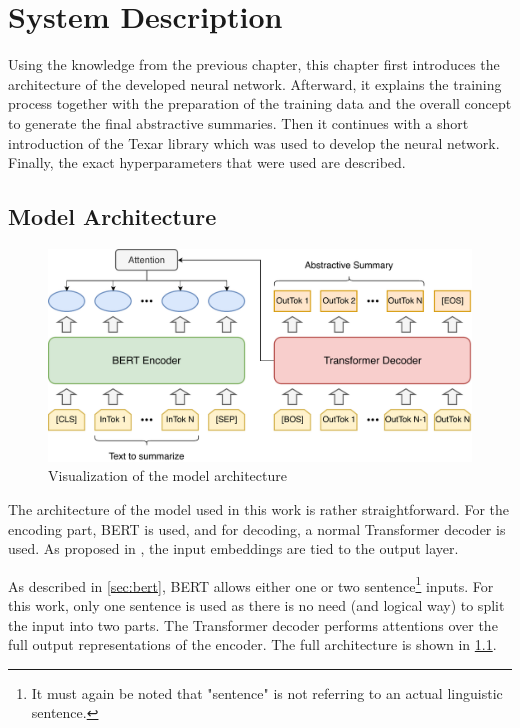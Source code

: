 \chapter{System Description}\label{ch:system-description}

Using the knowledge from the previous chapter, this chapter first introduces the architecture of the developed neural network.
Afterward, it explains the training process together with the preparation of the training data and the overall concept to generate the final abstractive summaries.
Then it continues with a short introduction of the Texar library \cite{hu2019texar} which was used to develop the neural network.
Finally, the exact hyperparameters that were used are described.


\section{Model Architecture}
 
\begin{figure}[h]
\centering
\includegraphics[width=0.7\paperwidth]{figures/summarization-architecture}
\caption{Visualization of the model architecture}
\label{fig:summarization-architecture}
\end{figure}

The architecture of the model used in this work is rather straightforward.
For the encoding part, BERT is used, and for decoding, a normal Transformer decoder is used.
As proposed in \cite{1608.05859}, the input embeddings are tied to the output layer.

As described in \cref{sec:bert}, BERT allows either one or two sentence\footnote{It must again be noted that "sentence" is not referring to an actual linguistic sentence.} inputs.
For this work, only one sentence is used as there is no need (and logical way) to split the input into two parts.
The Transformer decoder performs attentions over the full output representations of the encoder.
The full architecture is shown in \cref{fig:summarization-architecture}.

